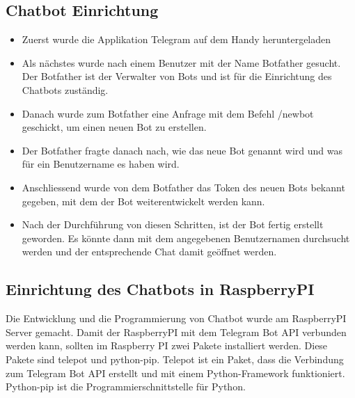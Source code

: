 \subsection{Chatbot Einrichtung}
\begin{itemize}
	\item Zuerst wurde die Applikation Telegram auf dem Handy heruntergeladen
\end{itemize}
\begin{itemize}
	\item Als nächstes wurde nach einem Benutzer mit der Name Botfather gesucht. Der Botfather ist der Verwalter von Bots und ist für die Einrichtung des Chatbots zuständig.
\end{itemize}
\begin{itemize}
	\item Danach wurde zum Botfather eine Anfrage mit dem Befehl /newbot geschickt, um einen neuen Bot zu erstellen. 
\end{itemize}
\begin{itemize}
	\item Der Botfather fragte danach nach, wie das neue Bot genannt wird und was für ein Benutzername es haben wird.  
\end{itemize}
\begin{itemize}
	\item Anschliessend wurde von dem Botfather das Token des neuen Bots bekannt gegeben, mit dem der Bot weiterentwickelt werden kann. 
\end{itemize}
\begin{itemize}
	\item Nach der Durchführung von diesen Schritten, ist der Bot fertig erstellt geworden. Es könnte dann mit dem angegebenen Benutzernamen durchsucht werden und der entsprechende Chat damit geöffnet werden. 
\end{itemize}
\subsection{Einrichtung des Chatbots in RaspberryPI}
Die Entwicklung und die Programmierung von Chatbot wurde am RaspberryPI Server gemacht. Damit der RaspberryPI mit dem Telegram Bot API verbunden werden kann, sollten im Raspberry PI zwei Pakete installiert werden. Diese Pakete sind telepot und python-pip. Telepot ist ein Paket, dass die Verbindung zum Telegram Bot API erstellt und mit einem Python-Framework funktioniert. Python-pip ist die Programmierschnittstelle für Python.\cite{50_telegram}
